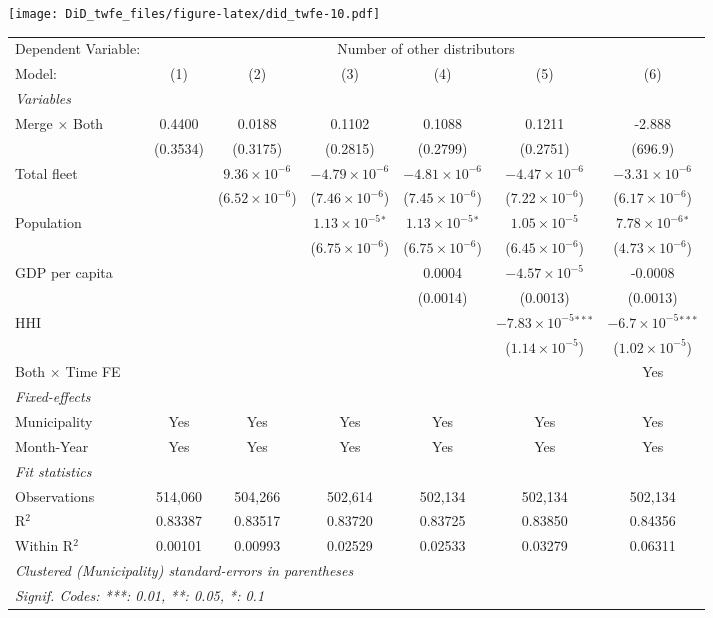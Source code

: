 \documentclass[
]{article}
\begin{document}
\texttt{[image: DiD\_twfe\_files/figure-latex/did\_twfe-10.pdf]}

\begin{tabular}{lcccccc}
\tabularnewline\midrule\midrule
Dependent Variable:&\multicolumn{6}{c}{Number of other distributors}\\
Model:&(1) & (2) & (3) & (4) & (5) & (6)\\
\midrule \emph{Variables}&   &   &   &   &   &  \\
Merge $\times $ Both & 0.4400 & 0.0188 & 0.1102 & 0.1088 & 0.1211 & -2.888\\
  &(0.3534) & (0.3175) & (0.2815) & (0.2799) & (0.2751) & (696.9)\\
Total fleet &    & $9.36\times 10^{-6}$ & $-4.79\times 10^{-6}$ & $-4.81\times 10^{-6}$ & $-4.47\times 10^{-6}$ & $-3.31\times 10^{-6}$\\
  &   & ($6.52\times 10^{-6}$) & ($7.46\times 10^{-6}$) & ($7.45\times 10^{-6}$) & ($7.22\times 10^{-6}$) & ($6.17\times 10^{-6}$)\\
Population &    &    & $1.13\times 10^{-5}$$^{*}$ & $1.13\times 10^{-5}$$^{*}$ & $1.05\times 10^{-5}$ & $7.78\times 10^{-6}$$^{*}$\\
  &   &    & ($6.75\times 10^{-6}$) & ($6.75\times 10^{-6}$) & ($6.45\times 10^{-6}$) & ($4.73\times 10^{-6}$)\\
GDP per capita &    &    &    & 0.0004 & $-4.57\times 10^{-5}$ & -0.0008\\
  &   &    &    & (0.0014) & (0.0013) & (0.0013)\\
HHI &    &    &    &    & $-7.83\times 10^{-5}$$^{***}$ & $-6.7\times 10^{-5}$$^{***}$\\
  &   &    &    &    & ($1.14\times 10^{-5}$) & ($1.02\times 10^{-5}$)\\
Both $\times$ Time FE &  &  &  &  &  & Yes\\
\midrule \emph{Fixed-effects}&   &   &   &   &   &  \\
Municipality & Yes & Yes & Yes & Yes & Yes & Yes\\
Month-Year & Yes & Yes & Yes & Yes & Yes & Yes\\
\midrule \emph{Fit statistics}&  & & & & & \\
Observations & 514,060&504,266&502,614&502,134&502,134&502,134\\
R$^2$ & 0.83387&0.83517&0.83720&0.83725&0.83850&0.84356\\
Within R$^2$ & 0.00101&0.00993&0.02529&0.02533&0.03279&0.06311\\
\midrule\midrule\multicolumn{7}{l}{\emph{Clustered (Municipality) standard-errors in parentheses}}\\
\multicolumn{7}{l}{\emph{Signif. Codes: ***: 0.01, **: 0.05, *: 0.1}}\\
\end{tabular}
\end{document}

